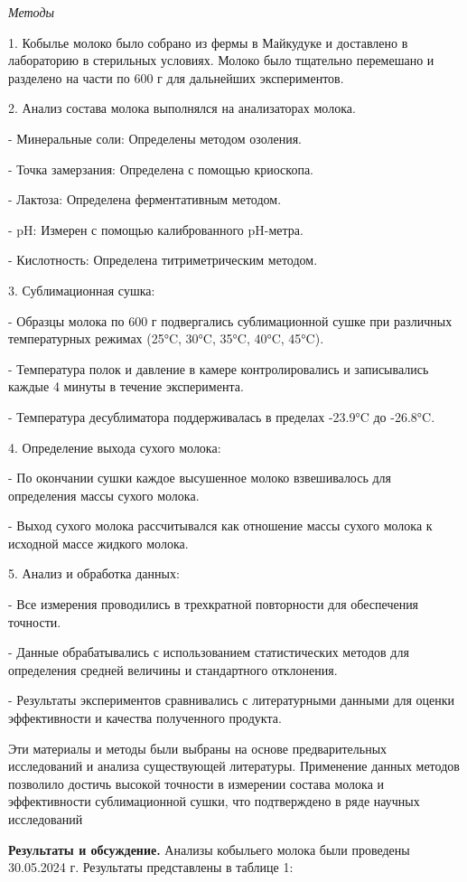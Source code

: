 \begin{multicols}{2}
\emph{Методы}

1. Кобылье молоко было собрано из фермы в Майкудуке и доставлено в
лабораторию в стерильных условиях. Молоко было тщательно перемешано и
разделено на части по 600 г для дальнейших экспериментов.

2. Анализ состава молока выполнялся на анализаторах молока.

- Минеральные соли: Определены методом озоления.

- Точка замерзания: Определена с помощью криоскопа.

- Лактоза: Определена ферментативным методом.

- pH: Измерен с помощью калиброванного pH-метра.

- Кислотность: Определена титриметрическим методом.

3. Сублимационная сушка:

- Образцы молока по 600 г подвергались сублимационной сушке при
различных температурных режимах (25°C, 30°C, 35°C, 40°C, 45°C).

- Температура полок и давление в камере контролировались и записывались
каждые 4 минуты в течение эксперимента.

- Температура десублиматора поддерживалась в пределах -23.9°C до
-26.8°C.

4. Определение выхода сухого молока:

- По окончании сушки каждое высушенное молоко взвешивалось для
определения массы сухого молока.

- Выход сухого молока рассчитывался как отношение массы сухого молока к
исходной массе жидкого молока.

5. Анализ и обработка данных:

- Все измерения проводились в трехкратной повторности для обеспечения
точности.

- Данные обрабатывались с использованием статистических методов для
определения средней величины и стандартного отклонения.

- Результаты экспериментов сравнивались с литературными данными для
оценки эффективности и качества полученного продукта.

Эти материалы и методы были выбраны на основе предварительных
исследований и анализа существующей литературы. Применение данных
методов позволило достичь высокой точности в измерении состава молока и
эффективности сублимационной сушки, что подтверждено в ряде научных
исследований

{\bfseries Результаты и обсуждение.} Анализы кобыльего молока были
проведены 30.05.2024 г. Результаты представлены в таблице 1:
\end{multicols}

